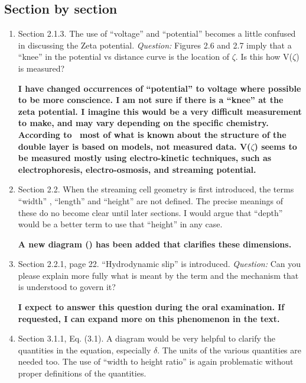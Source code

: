   \subsection*{Section by section}
    \begin{enumerate}
      \item Section 2.1.3. The use of ``voltage'' and ``potential'' becomes a little confused in discussing the Zeta potential.
      \emph{Question:} Figures 2.6 and 2.7 imply that a ``knee'' in the potential vs distance curve is the location of $\zeta$. Is this how V($\zeta$) is measured?

      \textbf{\textcolor{OliveGreen}{
        I have changed occurrences of ``potential'' to voltage where possible to be more conscience.
        I am not sure if there is a ``knee'' at the zeta potential. I imagine this would be a very difficult measurement to make, and may vary depending on the specific chemistry.
        According to~\cite{Bard1993} most of what is known about the structure of the double layer is based on models, not measured data.
        V($\zeta$) seems to be measured mostly using electro-kinetic techniques, such as electrophoresis, electro-osmosis, and streaming potential.
      }}

      \item Section 2.2. When the streaming cell geometry is first introduced, the terms ``width'' , ``length'' and ``height'' are not defined. The precise meanings of these do no become clear until later sections. I would argue that ``depth'' would be a better term to use that ``height'' in any case.

      \textbf{\textcolor{OliveGreen}{
        A new diagram () has been added that clarifies these dimensions.
      }}

      \item Section 2.2.1, page 22. ``Hydrodynamic slip'' is introduced.
      \emph{Question:} Can you please explain more fully what is meant by the term and the mechanism that is understood to govern it?

      \textbf{\textcolor{OliveGreen}{
        I expect to answer this question during the oral examination. If requested, I can expand more on this phenomenon in the text.
      }}

      \item Section 3.1.1, Eq. (3.1). A diagram would be very helpful to clarify the quantities in the equation, especially $\delta$. The units of the various quantities are needed too. The use of ``width to height ratio'' is again problematic without proper definitions of the quantities.


\end{enumerate}
